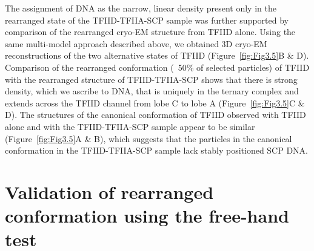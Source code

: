 \indent The assignment of DNA as the narrow, linear density present only in the rearranged state of the TFIID-TFIIA-SCP sample was further supported by comparison of the rearranged cryo-EM structure from TFIID alone. Using the same multi-model approach described above, we obtained 3D cryo-EM reconstructions of the two alternative states of TFIID (Figure~\ref{fig:Fig3.5}B \& D). Comparison of the rearranged conformation (~50\% of selected particles) of TFIID with the rearranged structure of TFIID-TFIIA-SCP shows that there is strong density, which we ascribe to DNA, that is uniquely in the ternary complex and extends across the TFIID channel from lobe C to lobe A (Figure~\ref{fig:Fig3.5}C \& D). The structures of the canonical conformation of TFIID observed with TFIID alone and with the TFIID-TFIIA-SCP sample appear to be similar (Figure~\ref{fig:Fig3.5}A \& B), which suggests that the particles in the canonical conformation in the TFIID-TFIIA-SCP sample lack stably positioned SCP DNA.\\

\section{Validation of rearranged conformation using the free-hand test}

